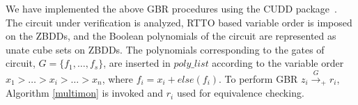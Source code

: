 We have implemented the above GBR procedures using the CUDD 
package~\cite{cudd}. The circuit under verification is analyzed, RTTO based
variable order is imposed on the ZBDDs, and the Boolean polynomials of
the circuit are represented as unate cube sets on ZBDDs. 
The polynomials corresponding to the gates of circuit,
$G=\{f_1,\dots,f_s\}$, are inserted in $poly\_list$ according to the
variable order $x_1 > \dots > x_i > \dots > x_n$, where $f_i = x_i +
else(f_i)$. %
To perform GBR $z_i\xrightarrow{G}_+ r_i$,
Algorithm \ref{multimon} is invoked and $r_i$ used for  equivalence checking. 
